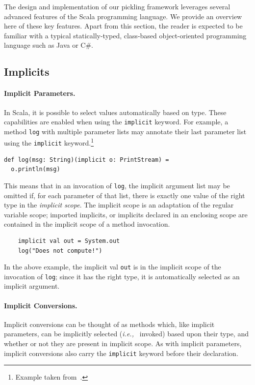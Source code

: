 \documentclass[preprint,10pt]{sigplanconf}
\theoremstyle{definition}
\theoremstyle{definition}
\newcommand{\todo}{{\bf \colorbox{red}{\color{white}TODO:}}}
\newcommand{\ie}{{\em i.e.,~}}
\newcommand{\term}[1]{\mbox{\texttt{#1}}}
\begin{document}
The design and implementation of our pickling framework leverages several
advanced features of the Scala programming language. We provide an overview
here of these key features. Apart from this section, the reader is expected to
be familiar with a typical statically-typed, class-based object-oriented
programming language such as Java or C\#.

\subsection{Implicits}
\label{sec:implicits}

\paragraph{Implicit Parameters.} In Scala, it is possible to select values
automatically based on type. These capabilities are enabled when using the
\term{implicit} keyword. For example, a method \term{log} with multiple
parameter lists may annotate their last parameter list using the
\term{implicit} keyword.\footnote{Example taken from~\cite{Oliveira2010}.}

\begin{lstlisting}
def log(msg: String)(implicit o: PrintStream) =
  o.println(msg)
\end{lstlisting}

This means that in an invocation of \term{log}, the implicit argument list may
be omitted if, for each parameter of that list, there is exactly one value of
the right type in the {\em implicit scope}. The implicit scope is an
adaptation of the regular variable scope; imported implicits, or implicits
declared in an enclosing scope are contained in the implicit scope of a method
invocation.

\begin{lstlisting}
    implicit val out = System.out
    log("Does not compute!")
\end{lstlisting}

In the above example, the implicit val \term{out} is in the implicit scope of
the invocation of \term{log}; since it has the right type, it is automatically
selected as an implicit argument.



\paragraph{Implicit Conversions.} Implicit conversions can be thought of as
methods which, like implicit parameters, can be implicitly selected (\ie
invoked) based upon their type, and whether or not they are present in
implicit scope. As with implicit parameters, implicit conversions also carry
the \term{implicit} keyword before their declaration.
\end{document}
